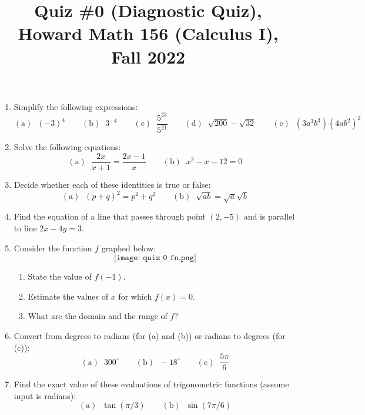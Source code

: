 \documentclass[11pt]{article}
\title{Quiz \#0 (Diagnostic Quiz), \\Howard Math 156 (Calculus I), Fall 2022}
\date{}
\begin{document}
\maketitle

\thispagestyle{empty}

\vspace{-1cm}

\begin{enumerate}
\item Simplify the following expressions:
\[ \mathrm{(a)} \; \; (-3)^4 \qquad \mathrm{(b)} \; \; 3^{-4} \qquad \mathrm{(c)} \; \; \frac{5^{23}}{5^{21}} \qquad \mathrm{(d)} \; \; \sqrt{200}-\sqrt{32} \qquad \mathrm{(e)} \; \; (3a^3b^3)(4ab^2)^2 \]
\item Solve the following equations:
\[ \mathrm{(a)} \; \; \frac{2x}{x+1} = \frac{2x-1}{x} \qquad \mathrm{(b)} \; \; x^2 - x -12 = 0\]
\item Decide whether each of these identities is true or false:
\[ \mathrm{(a)} \; \; (p+q)^2 = p^2 + q^2 \qquad \mathrm{(b)} \; \; \sqrt{ab} = \sqrt{a}\sqrt{b}  \]
\item Find the equation of a line that passes through point $(2,-5)$ and is parallel to line $2x-4y=3$.

\item Consider the function $f$ graphed below:
\[ \texttt{[image: quiz\_0\_fn.png]} \]
\begin{enumerate}
\item State the value of $f(-1)$.
\item Estimate the values of $x$ for which $f(x)=0$.
\item What are the domain and the range of $f$?
\end{enumerate}

\item Convert from degrees to radians (for (a) and (b)) or radians to degrees (for (c)):
\[ \mathrm{(a)} \; \; 300^{\circ} \qquad \mathrm{(b)} \; \; -18^{\circ} \qquad \mathrm{(c)} \; \; \frac{5\pi}{6}\]

\item Find the exact value of these evaluations of trigonometric functions (assume input is radians):
\[ \mathrm{(a)} \; \; \tan(\pi/3) \qquad \mathrm{(b)} \; \; \sin(7\pi/6)\]

\end{enumerate}
\end{document}
